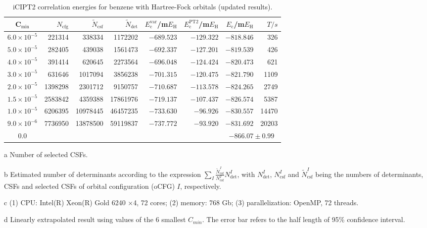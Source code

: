 \documentclass[journal=jcp,manuscript=suppinfo]{achemso}
\begin{document}
\begin{table}[!htp]
	\small
	\caption{iCIPT2 correlation energies for benzene with Hartree-Fock orbitals (updated results).}
\begin{threeparttable}
	\begin{tabular}{c|rrrrrrr}\toprule
		C$_{\text{min}}$&$N_{\mathrm{cfg}}$&$\tilde{N}_{\mathrm{csf}}$\tnote{a}&$\tilde{N}_{\mathrm{det}}$\tnote{b}
		&$E_{\mathrm{c}}^{\mathrm{var}}$/m$E_{\text{H}}$&$E_{\mathrm{c}}^{\mathrm{PT2}}$/m$E_{\text{H}}$&$E_{\mathrm{c}}$/m$E_{\text{H}}$&$T/s$\tnote{c}\\\toprule
	$6.0\times10^{-5}$ &  221314 &   338334 & 1172202
	& $-689.523$ &    $-129.322$ &  $-818.846$ &326\\
	$5.0\times10^{-5}$ &  282405 &   439038 & 1561473
	& $-692.337$ &    $-127.201$ &  $-819.539$ &426\\
	$4.0\times10^{-5}$ &  391414 &   620645 & 2273564
	& $-696.048$ &    $-124.424$ &  $-820.473$ &621\\
	$3.0\times10^{-5}$ &  631646 &  1017094 & 3856238
	& $-701.315$ &    $-120.475$ &  $-821.790$ &1109\\
	$2.0\times10^{-5}$ & 1398298 &  2301712 & 9150757
	& $-710.687$ &    $-113.578$ &  $-824.265$ &2749\\
	$1.5\times10^{-5}$ & 2583842 &  4359388 &17861976
	& $-719.137$ &    $-107.437$ &  $-826.574$ &5387\\
	$1.0\times10^{-5}$ & 6206395 & 10978445 &46457235
	& $-733.630$ &    $-96.926$ &  $-830.557$ &14470\\
	$9.0\times10^{-6}$ & 7736950 & 13878500 &59119837
	& $-737.772$ &    $-93.920$ &  $-831.692$ &20203\\\midrule
	0.0\tnote{b}&&&&&&\multicolumn{2}{c}{$-866.07\pm0.99$}\\\bottomrule
	\end{tabular}
\begin{tablenotes}
	\item[a]Number of selected CSFs.
	\item[b]Estimated number of determinants according to the expression $\sum_I\frac{\tilde{N}_{\mathrm{csf}}^I}{N_{\mathrm{csf}}^I}N_{\mathrm{det}}^I$, with $N_{\mathrm{det}}^I$, $N_{\mathrm{csf}}^I$ and $\tilde{N}_{\mathrm{csf}}^I$ being the numbers of determinants, CSFs and selected CSFs of orbital configuration (oCFG) $I$, respectively.
	\item[c](1) CPU: Intel(R) Xeon(R) Gold 6240 $\times$4, 72 cores; (2) memory: 768 Gb; (3) parallelization: OpenMP, 72 threads.
	\item[d]Linearly extrapolated result using values of the 6 smallest $C_{min}$. The error bar refers to the half length of 95\% confidence interval.
\end{tablenotes}
\end{threeparttable}
\label{NewHF}
\end{table}
\end{document}
